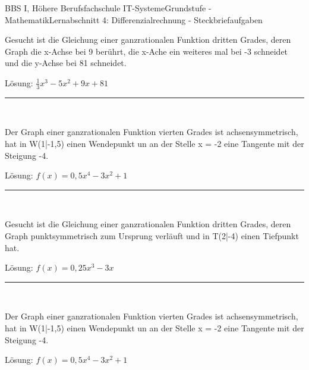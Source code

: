 \documentclass[oneside,openany,headings=optiontotoc,11pt,numbers=noenddot]{scrreprt}
\begin{document}
		\begin{worksheet}{BBS I, Höhere Berufsfachschule IT-Systeme}{Grundstufe - Mathematik}{Lernabschnitt 4: Differenzialrechnung - Steckbriefaufgaben}
			\begin{framed}
				\noindent
				Gesucht ist die Gleichung einer ganzrationalen Funktion dritten Grades, deren Graph die x-Achse bei 9 berührt, die x-Ache ein weiteres mal bei -3 schneidet und die y-Achse bei 81 schneidet.\\
				\par\noindent
				\footnotesize{Lösung: \(\frac{1}{3}x^3 - 5x^2 + 9x +81\)}\\\normalsize
				\par\noindent
				\rule{\textwidth}{0.1pt}\\
				\par\noindent
				Der Graph einer ganzrationalen Funktion vierten Grades ist achsensymmetrisch, hat in W(1|-1,5) einen Wendepunkt un an der Stelle x = -2 eine Tangente mit der Steigung -4.\\
				\par\noindent
				\footnotesize{Lösung: \(f(x) = 0,5x^4 - 3x^2 + 1\)}\\
				\par\noindent
				\rule{\textwidth}{0.1pt}\\
				\par\noindent
				Gesucht ist die Gleichung einer ganzrationalen Funktion dritten Grades, deren Graph punktsymmetrisch zum Ursprung verläuft und in T(2|-4) einen Tiefpunkt hat.\\
				\par\noindent
				\footnotesize{Lösung: \(f(x) = 0,25x^3 - 3x\)}\\\normalsize
				\par\noindent
				\rule{\textwidth}{0.1pt}\\
				\par\noindent
				Der Graph einer ganzrationalen Funktion vierten Grades ist achsensymmetrisch, hat in W(1|-1,5) einen Wendepunkt un an der Stelle x = -2 eine Tangente mit der Steigung -4.\\
				\par\noindent
				\footnotesize{Lösung: \(f(x) = 0,5x^4 - 3x^2 + 1\)}\\
			\end{framed}
		\end{worksheet}
\end{document}
